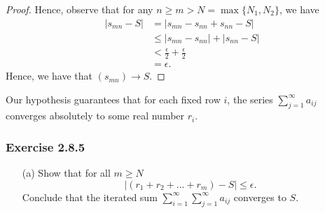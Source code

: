 \begin{enumerate}
\begin{enumerate}
\begin{proof}
                Hence, observe that for any \( n \geq m > N = \max \{ N_1, N_2 \}  \), we have
                \begin{align*}
                    | s_{mn} - S  | &= | s_{mn} - s_{nn} + s_{nn} - S  |  \\
                                    &\leq  | s_{mn} - s_{nn} | + | s_{nn} - S  | \\ 
                                    &< \frac{ \epsilon  }{ 2 } + \frac{ \epsilon  }{ 2 } \\
                                    &= \epsilon.
                \end{align*}
                Hence, we have that \( (s_{mn} ) \to S \). 
            \end{proof}
        \end{enumerate}

        Our hypothesis guarantees that for each fixed row \( i \), the series \( \sum_{ j=1 }^{ \infty  } a_{ij} \) converges absolutely to some real number \( r_i  \). 

        \subsubsection{Exercise 2.8.5}
        \begin{enumerate}
            \item[(a)] Show that for all \( m \geq N \) 
                \[ | (r_1 + r_2 + ... + r_m) - S  | \leq \epsilon. \]
                Conclude that the iterated sum \( \sum_{ i=1 }^{ \infty  } \sum_{ j=1 }^{ \infty  } a_{ij} \) converges to \( S \). 
        \end{enumerate}

\end{enumerate}






